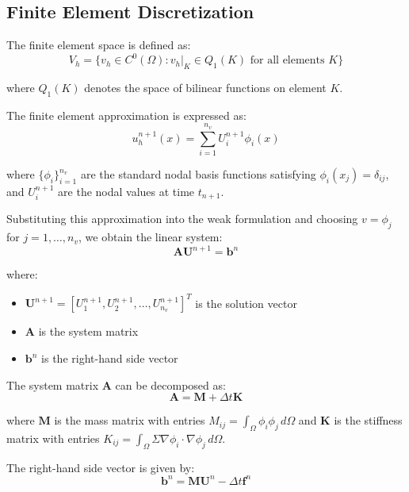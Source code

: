 \documentclass[12pt,a4paper]{article}
\begin{document}
\subsection{Finite Element Discretization}

The finite element space is defined as:
\begin{equation}
V_h = \{v_h \in C^0(\Omega) : v_h|_K \in Q_1(K) \text{ for all elements } K\}
\end{equation}

where $Q_1(K)$ denotes the space of bilinear functions on element $K$.

The finite element approximation is expressed as:
\begin{equation}
u_h^{n+1}(x) = \sum_{i=1}^{n_v} U_i^{n+1} \phi_i(x)
\end{equation}

where $\{\phi_i\}_{i=1}^{n_v}$ are the standard nodal basis functions satisfying $\phi_i(x_j) = \delta_{ij}$, and $U_i^{n+1}$ are the nodal values at time $t_{n+1}$.

Substituting this approximation into the weak formulation and choosing $v = \phi_j$ for $j = 1, \ldots, n_v$, we obtain the linear system:
\begin{equation}
\mathbf{A} \mathbf{U}^{n+1} = \mathbf{b}^n
\end{equation}

where:
\begin{itemize}
\item $\mathbf{U}^{n+1} = [U_1^{n+1}, U_2^{n+1}, \ldots, U_{n_v}^{n+1}]^T$ is the solution vector
\item $\mathbf{A}$ is the system matrix
\item $\mathbf{b}^n$ is the right-hand side vector
\end{itemize}

The system matrix $\mathbf{A}$ can be decomposed as:
\begin{equation}
\mathbf{A} = \mathbf{M} + \Delta t \mathbf{K}
\end{equation}

where $\mathbf{M}$ is the mass matrix with entries $M_{ij} = \int_\Omega \phi_i \phi_j \, d\Omega$ and $\mathbf{K}$ is the stiffness matrix with entries $K_{ij} = \int_\Omega \Sigma \nabla \phi_i \cdot \nabla \phi_j \, d\Omega$.

The right-hand side vector is given by:
\begin{equation}
\mathbf{b}^n = \mathbf{M} \mathbf{U}^n - \Delta t \mathbf{f}^n
\end{equation}
\end{document}
